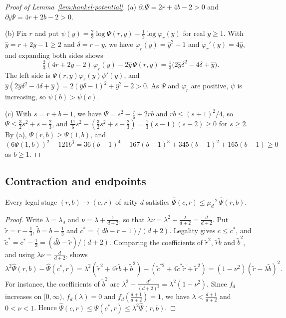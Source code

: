 \begin{proof}[Proof of Lemma~\ref{lem:hankel-potential}]
(a) \(\partial_r\Psi=2r+4b-2>0\) and \(\partial_b\Psi=4r+2b-2>0\).

(b) Fix \(r\) and put \(\psi(y)=\frac23\log\Psi(r,y)-\frac12\log\varphi_r(y)\)
for real \(y\ge1\). With \(\hat y=r+2y-1\ge2\) and \(\delta=r-y\), we have
\(\varphi_r(y)=\hat y^2-1\) and \(\varphi_r'(y)=4\hat y\), and expanding
both sides shows
\[
 \tfrac23(4r+2y-2)\,\varphi_r(y)-2\hat y\,\Psi(r,y)=\tfrac13\bigl(2\hat y\delta^2-4\delta+\hat y\bigr).
\]
The left side is \(\Psi(r,y)\varphi_r(y)\psi'(y)\), and
\(\hat y(2\hat y\delta^2-4\delta+\hat y)=2(\hat y\delta-1)^2+\hat y^2-2>0\). As \(\Psi\) and
\(\varphi_r\) are positive, \(\psi\) is increasing, so
\(\psi(b)>\psi(c)\).

(c) With \(s=r+b-1\), we have \(\Psi=s^2-\frac76+2rb\) and
\(rb\le(s+1)^2/4\), so \(\Psi\le\frac32s^2+s-\frac23\), and
\(\frac{11}6s^2-(\frac32s^2+s-\frac23)=\frac13(s-1)(s-2)\ge0\) for
\(s\ge2\). By (a), \(\Psi(r,b)\ge\Psi(1,b)\), and
\((6\Psi(1,b))^2-121b^3=36(b-1)^4+167(b-1)^3+345(b-1)^2+165(b-1)\ge0\)
as \(b\ge1\).
\end{proof}

\subsection{Contraction and endpoints}
\label{subsec:lower-endpoint}

\begin{lemma}[Contraction]\label{lem:lower-contraction}
Every legal stage \((r,b)\to(c,r)\) of arity \(d\) satisfies
\(\hat\Psi(c,r)\le\mu_d^{-2}\,\hat\Psi(r,b)\).
\end{lemma}

\begin{proof}
Write \(\lambda=\lambda_d\) and \(\nu=\lambda+\frac1{d+2}\), so that
\(\lambda\nu=\lambda^2+\frac\lambda{d+2}=\frac d{d+2}\). Put
\(\tilde r=r-\frac13\), \(\tilde b=b-\frac13\) and
\(c^*=(db-r+1)/(d+2)\). Legality gives \(c\le c^*\), and
\(\tilde c^*=c^*-\frac13=(d\tilde b-\tilde r)/(d+2)\). Comparing the
coefficients of \(\tilde r^2\), \(\tilde r\tilde b\) and \(\tilde b^2\),
and using \(\lambda\nu=\frac d{d+2}\), shows
\[
 \lambda^2\hat\Psi(r,b)-\hat\Psi(c^*,r)
 =\lambda^2(\tilde r^2+4\tilde r\tilde b+\tilde b^2)
 -(\tilde c^{*2}+4\tilde c^*\tilde r+\tilde r^2)
 =(1-\nu^2)(\tilde r-\lambda\tilde b)^2 .
\]
For instance, the coefficients of \(\tilde b^2\) are
\(\lambda^2-\frac{d^2}{(d+2)^2}=\lambda^2(1-\nu^2)\). Since \(f_d\)
increases on \([0,\infty)\), \(f_d(\lambda)=0\) and
\(f_d(\frac{d+1}{d+2})=1\), we have \(\lambda<\frac{d+1}{d+2}\) and
\(0<\nu<1\). Hence \(\hat\Psi(c,r)\le\hat\Psi(c^*,r)\le\lambda^2\hat\Psi(r,b)\).
\end{proof}

